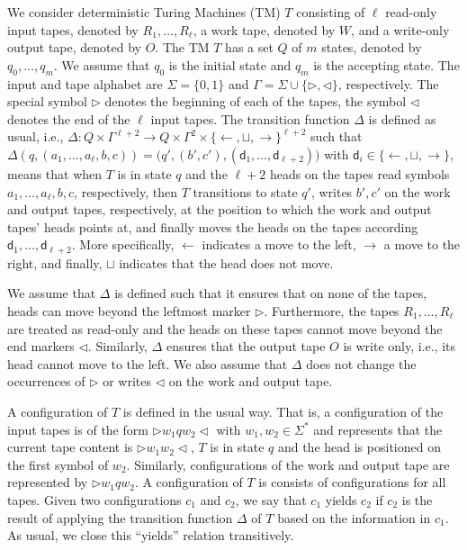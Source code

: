 We consider  deterministic Turing Machines  (TM) $T$ consisting of $\ell$ read-only input tapes, 
denoted by $R_1,\ldots,R_\ell$,
a work tape, denoted by $W$, and a write-only output tape, denoted by $O$. The TM $T$ has a set $Q$ of $m$
states, denoted by $q_0,\ldots,q_m$. We assume that $q_0$ is the initial state and $q_m$ is the accepting state.
The input and tape alphabet are $\Sigma=\{0,1\}$ and $\Gamma=\Sigma\cup\{\rhd,\lhd\}$, respectively. The special 
symbol $\rhd$ denotes the beginning of each of the tapes, the symbol $\lhd$ denotes the end of the $\ell$ input tapes. 
The transition function $\Delta$ is defined as usual, i.e., 
$\Delta:Q\times \Gamma^{\ell+2} \to Q\times \Gamma^{2}\times \{\leftarrow,\sqcup,\rightarrow\}^{\ell+2}$ 
such that $\Delta(q,(a_1,\ldots,a_{\ell},b,c))=\bigl(q',(b',c'),(\mathsf{d}_1,\ldots,\mathsf{d}_{\ell+2})\bigr)$
with $\mathsf{d}_i\in \{\leftarrow,\sqcup,\rightarrow\}$, means that when $T$ is in state $q$ and the $\ell+2$ 
heads on the tapes read symbols $a_1,\ldots,a_{\ell},b,c$, respectively, then $T$ transitions to state $q'$,
writes $b',c'$ on the work and output tapes, respectively, at the position to which the work and output 
tapes' heads points at, and finally moves the heads on the tapes according 
$\mathsf{d}_1,\ldots,\mathsf{d}_{\ell+2}$. More specifically, $\leftarrow$  indicates a move to the left, 
$\rightarrow$ a move to the right, and finally, $\sqcup$ indicates that the head does not move.

We assume that $\Delta$ is defined such that it ensures that on none of the tapes, heads can move beyond 
the leftmost marker $\rhd$. Furthermore, the tapes $R_1,\ldots,R_\ell$ are treated as read-only and the heads 
on these tapes cannot move beyond the end markers $\lhd$. Similarly, $\Delta$ ensures that the output tape $O$ 
is write only, i.e., its head cannot move to the left.  We also assume that $\Delta$ does not change the 
occurrences of $\rhd$ or writes $\lhd$ on the work and output tape.

A configuration of $T$ is defined in the usual way. That is, a configuration of the input tapes is of the form
$\rhd w_1qw_2\lhd$ with $w_1,w_2\in\Sigma^*$ and represents that the current tape content is 
$\rhd w_1w_2\lhd$, $T$ is in state $q$ and the head is positioned on the first symbol of $w_2$. 
Similarly, configurations of the work and output tape are represented by $\rhd w_1qw_2$. 
A configuration of $T$ is consists of configurations for all tapes. Given two configurations 
$c_1$ and $c_2$, we say that $c_1$ yields $c_2$ if $c_2$ is the result of applying the transition 
function $\Delta$ of $T$ based on the information in $c_1$. As usual, we close this ``yields'' relation 
transitively.

